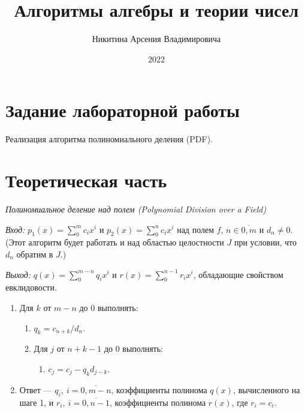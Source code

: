 \documentclass[bachelor, och, labwork]{shiza}
\begin{document}
\title{Алгоритмы алгебры и теории чисел}





\author{Никитина Арсения Владимировича}




\date{2022}

\maketitle



\tableofcontents

\section{Задание лабораторной работы}

Реализация алгоритма полиномиального деления (PDF).

\section{Теоретическая часть}

\begin{center}
    \textit{Полиномиальное деление над полем (Polynomial Division
    over a Field)}
\end{center}

\textit{Вход:} $p_1(x) = \sum^{m}_0 c_ix^i$ и $p_2(x) = \sum^{n}_0 c_ix^i$ над
полем $f$, $n\in\overline{0,m}$ и $d_n \not=0$. (Этот алгоритм будет работать и 
над областью целостности $J$ при условии, что $d_n$ обратим в $J$.)

\textit{Выход:} $q(x) = \sum^{m-n}_{0} q_ix^i$ и $r(x) = \sum^{n-1}_{0} r_ix^i$,
обладающие свойством евклидовости.

\begin{enumerate}
    \item Для $k$ от $m-n$ до $0$ выполнять:
    \begin{enumerate}
        \item $q_k= c_{n+k}/d_n$.
        \item Для $j$ от $n + k - 1$ до $0$ выполнять:
        \begin{enumerate}
            \item $c_j=c_j-q_kd_{j-k}.$
        \end{enumerate}
    \end{enumerate}
    \item Ответ --- $q_i, ~i=\overline{0, m - n}$, коэффициенты полинома $q(x)$,
    вычисленного на шаге 1, и $r_i, ~i=\overline{0, n - 1}$, коэффициенты
    полинома $r(x)$, где $r_i=c_i$.

\end{enumerate}
\end{document}
